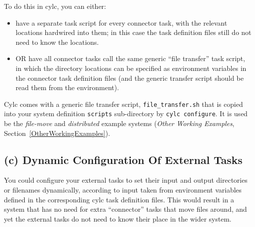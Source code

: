 \documentclass[11pt,a4paper]{article}
\begin{document}
To do this in cylc, you can either:

\begin{itemize}
    \item have a separate task script for every connector task, with the
        relevant locations hardwired into them; in this case the task
        definition files still do not need to know the locations.
    \item OR have all connector tasks call the same generic ``file
        transfer'' task script, in which the directory locations can be
        specified as environment variables in the connector task
        definition files (and the generic transfer script should be read
        them from the environment).
\end{itemize}

Cylc comes with a generic file transfer script, \lstinline=file_transfer.sh= that
is copied into your system definition \lstinline=scripts= sub-directory 
by \lstinline=cylc configure=. It is used be the {\em file-move} and {\em distributed}
example systems ({\em Other Working Examples}, Section~\ref{OtherWorkingExamples}).

\subsection{(c) Dynamic Configuration Of External Tasks}

You could configure your external tasks to set their input and output
directories or filenames dynamically, according to input taken from
environment variables defined in the corresponding cylc task definition
files. This would result in a system that has no need for extra
``connector'' tasks that move files around, and yet the external tasks
do not need to know their place in the wider system.

%
\end{document}
